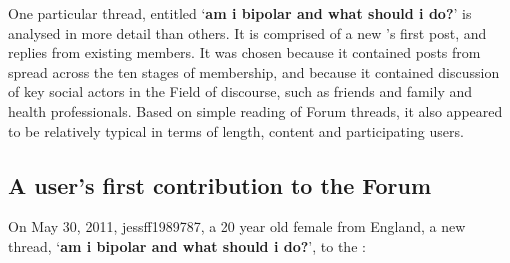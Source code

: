 One particular \gls{thread}, entitled `\textbf{am i bipolar and what should i do?}' is analysed in more detail than others. It is comprised of a new 's first \gls{post}, and replies from existing \glspl{member}. It was chosen because it contained \glspl{post} from  spread across the ten stages of membership, and because it contained discussion of key social actors in the Field of discourse, such as friends and family and health professionals. Based on simple reading of \gls{Forum} \glspl{thread}, it also appeared to be relatively typical in terms of length, content and participating users.%

\subsection{A user's first contribution to the Forum} \label{sect:jess-post}

On May 30, 2011, jessff1989787, a 20 year old female from England,  a new \gls{thread}, `\textbf{am i bipolar and what should i do?}', to the :

